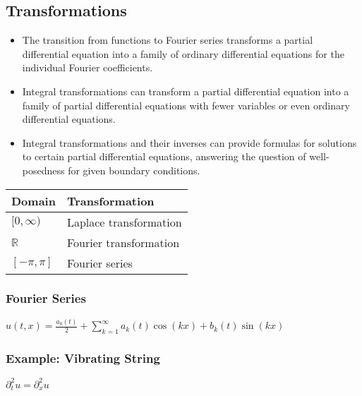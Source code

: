 
\subsection{Transformations}
\begin{itemize}
\item The transition from functions to Fourier series transforms a partial differential equation into a family of ordinary differential equations for the individual Fourier coefficients.
\item Integral transformations can transform a partial differential equation into a family of partial differential equations with fewer variables or even ordinary differential equations.
\item Integral transformations and their inverses can provide formulas for solutions to certain partial differential equations, answering the question of well-posedness for given boundary conditions.
\end{itemize}

\begin{tabular}{ll}
  Domain & Transformation \\
  \hline
  $[0, \infty)$ & Laplace transformation \\
  $\mathbb{R}$ & Fourier transformation \\
  $[- \pi, \pi]$ & Fourier series \\
\end{tabular}

\subsubsection{Fourier Series}
$\boxed{u(t,x)=\frac{a_0(t)}{2}+\sum\limits_{k=1}^{\infty}{a_k(t)\cos(kx)+b_k(t)\sin(kx)}}$\\[0.4cm]

\subsubsection{Example: Vibrating String}

$\boxed{\partial_t^2u=\partial_x^2u}$

